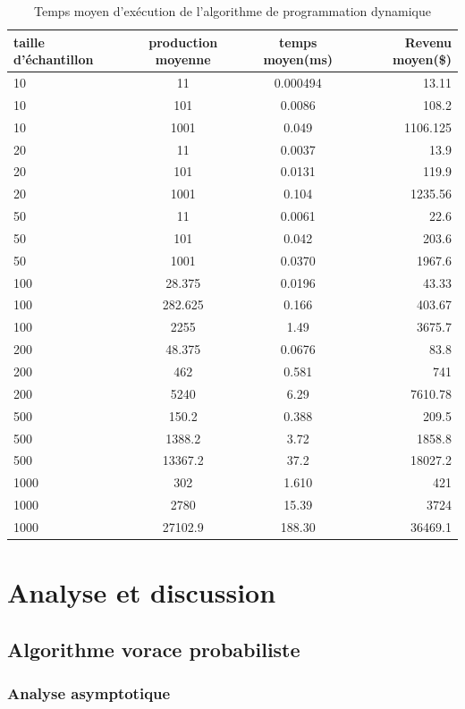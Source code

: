 \documentclass[a4paper, 12pt]{article} %
\begin{document}
\begin{table}[H]
\caption{Temps moyen d'exécution de l'algorithme de programmation dynamique}
\centering
\begin{tabular}{| l | c | c | r |}
\hline
taille d'échantillon & production moyenne & temps moyen(ms)  & Revenu moyen(\$)\\
\hline
10 & 11 & 0.000494 & 13.11\\
\hline
10 & 101 & 0.0086 & 108.2\\
\hline
10 & 1001 & 0.049 & 1106.125\\
\hline
20 & 11 & 0.0037 & 13.9\\
\hline
20 & 101 & 0.0131 & 119.9\\
\hline
20 & 1001 & 0.104 & 1235.56\\
\hline
50 & 11 & 0.0061 & 22.6\\
\hline
50 & 101 & 0.042 & 203.6\\
\hline
50 & 1001 & 0.0370 & 1967.6\\
\hline
100 & 28.375 & 0.0196 & 43.33\\
\hline
100 & 282.625 & 0.166 & 403.67\\
\hline
100 & 2255 & 1.49 & 3675.7\\
\hline
200 & 48.375 & 0.0676 & 83.8\\
\hline
200 & 462 & 0.581 & 741\\
\hline
200 & 5240 & 6.29 & 7610.78\\
\hline
500 & 150.2 & 0.388 & 209.5\\
\hline
500 & 1388.2 & 3.72 & 1858.8\\
\hline
500 & 13367.2 & 37.2 & 18027.2\\
\hline
1000 & 302 & 1.610 & 421\\
\hline
1000 & 2780 & 15.39 & 3724\\
\hline
1000 & 27102.9 & 188.30 & 36469.1\\
\hline
\end{tabular}
\end{table}
\section*{Analyse et discussion}
\subsection*{Algorithme vorace probabiliste}
\subsubsection*{Analyse asymptotique}
\end{document}
